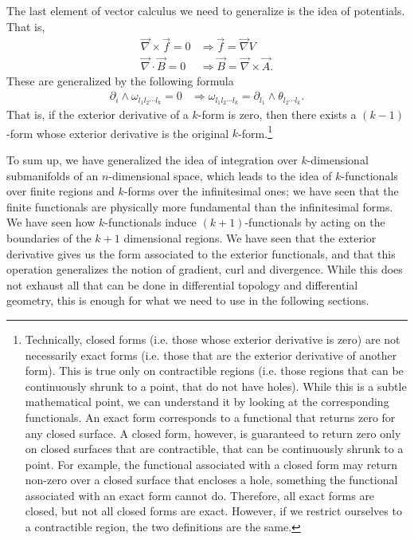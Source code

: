 The last element of vector calculus we need to generalize is the idea of potentials. That is,
\begin{equation}
	\begin{aligned}
		\vec{\nabla} \times \vec{f} = 0 &\Rightarrow \vec{f} = \vec{\nabla} V \\
		\vec{\nabla} \cdot \vec{B} = 0 &\Rightarrow \vec{B} = \vec{\nabla} \times \vec{A} .
	\end{aligned}
\end{equation}
These are generalized by the following formula
\begin{equation}
	\begin{aligned}
		\partial_i \wedge \omega_{l_1 l_2 \cdots l_{k}} = 0 &\Rightarrow   \omega_{l_1 l_2 \cdots l_{k}} = \partial_{l_1} \wedge \theta_{l_2 \cdots l_{k}} .
	\end{aligned}
\end{equation}
That is, if the exterior derivative of a $k$-form is zero, then there exists a $(k-1)$-form whose exterior derivative is the original $k$-form.\footnote{
Technically, closed forms (i.e. those whose exterior derivative is zero) are not necessarily exact forms (i.e. those that are the exterior derivative of another form). This is true only on contractible regions (i.e. those regions that can be continuously shrunk to a point, that do not have holes). While this is a subtle mathematical point, we can understand it by looking at the corresponding functionals. An exact form corresponds to a functional that returns zero for any closed surface. A closed form, however, is guaranteed to return zero only on closed surfaces that are contractible, that can be continuously shrunk to a point. For example, the functional associated with a closed form may return non-zero over a closed surface that encloses a hole, something the functional associated with an exact form cannot do. Therefore, all exact forms are closed, but not all closed forms are exact. However, if we restrict ourselves to a contractible region, the two definitions are the same.}

To sum up, we have generalized the idea of integration over $k$-dimensional submanifolds of an $n$-dimensional space, which leads to the idea of $k$-functionals over finite regions and $k$-forms over the infinitesimal ones; we have seen that the finite functionals are physically more fundamental than the infinitesimal forms. We have seen how $k$-functionals induce $(k+1)$-functionals by acting on the boundaries of the $k+1$ dimensional regions. We have seen that the exterior derivative gives us the form associated to the exterior functionals, and that this operation generalizes the notion of gradient, curl and divergence. While this does not exhaust all that can be done in differential topology and differential geometry, this is enough for what we need to use in the following sections.

